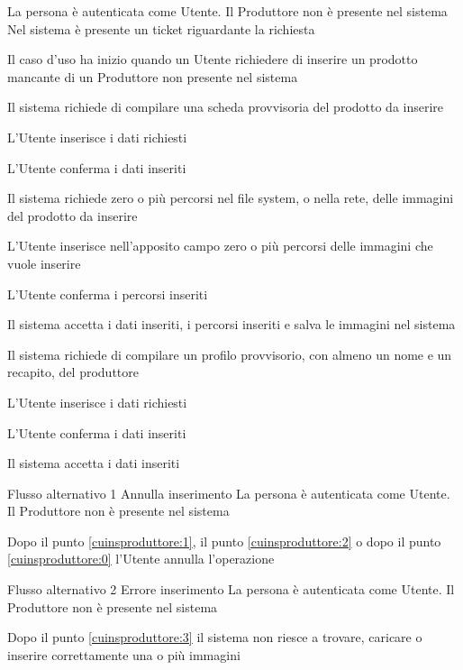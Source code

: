 {}
{La persona è autenticata come Utente. Il Produttore non è presente nel sistema}
{Nel sistema è presente un ticket riguardante la richiesta}
{\begin{enumCU}
		\item Il caso d'uso ha inizio quando un Utente richiedere di inserire un prodotto mancante di un Produttore non presente nel sistema
		\item Il sistema richiede di compilare una scheda provvisoria del prodotto da inserire
		\item L'Utente inserisce i dati richiesti \label{cuinsproduttore:1}
		\item L'Utente conferma i dati inseriti 
		\item Il sistema richiede zero o più percorsi nel file system, o nella rete, delle immagini del prodotto da inserire
		\item L'Utente inserisce nell'apposito campo zero o più percorsi delle immagini che vuole inserire \label{cuinsproduttore:2}
		\item L'Utente conferma i percorsi inseriti \label{cuinsproduttore:3}
		\item Il sistema accetta i dati inseriti, i percorsi inseriti e salva le immagini nel sistema
		\item Il sistema richiede di compilare un profilo provvisorio, con almeno un nome e un recapito, del produttore
		\item L'Utente inserisce i dati richiesti \label{cuinsproduttore:0}
		\item L'Utente conferma i dati inseriti
		\item Il sistema accetta i dati inseriti
	\end{enumCU}}
%
{Flusso alternativo 1}%
{Annulla inserimento}%
{La persona è autenticata come Utente. Il Produttore non è presente nel sistema}%
{\postNulle}%
{\begin{enumCU}
		\item Dopo il punto \ref{cuinsproduttore:1}, il punto \ref{cuinsproduttore:2} o dopo il punto \ref{cuinsproduttore:0} l'Utente annulla l'operazione
	\end{enumCU}}%
%
{Flusso alternativo 2}%
{Errore inserimento}%
{La persona è autenticata come Utente. Il Produttore non è presente nel sistema}%
{\postNulle}%
{\begin{enumCU}
		\item Dopo il punto \ref{cuinsproduttore:3} il sistema non riesce a trovare, caricare o inserire correttamente una o più immagini
	\end{enumCU}}%

